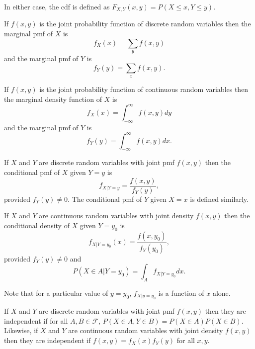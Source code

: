\documentclass{article}
\begin{document}
In either case, the cdf is defined as $F_{X, Y}(x, y) = P(X \le x, Y \le y)$.

\begin{defn}\label{c2d13}
If $f(x, y)$ is the joint probability function of discrete random variables then
the marginal pmf of $X$ is
\[
f_X(x) = \sum_y f(x, y)
\]
and the marginal pmf of $Y$ is
\[
f_Y(y) = \sum_x f(x, y).
\]
\end{defn}

\begin{defn}\label{c2d14}
If $f(x, y)$ is the joint probability function of continuous random variables then
the marginal density function of $X$ is
\[
f_X(x) = \int_{-\infty}^\infty f(x, y) dy
\]
and the marginal pmf of $Y$ is
\[
f_Y(y) = \int_{-\infty}^\infty f(x, y) dx.
\]
\end{defn}

\begin{defn}\label{c2d15}
If $X$ and $Y$ are discrete random variables with joint pmf $f(x, y)$ then the
conditional pmf of $X$ given $Y = y$ is
\[
f_{X|Y=y} = \frac{f(x, y)}{f_Y(y)},
\]
provided $f_Y(y) \ne 0$. The conditional pmf of $Y$ given $X = x$ is defined 
similarly.
\end{defn}

\begin{defn}\label{c2d16}
If $X$ and $Y$ are continuous random variables with joint density $f(x, y)$ then
the conditional density of $X$ given $Y = y_0$ is
\[
f_{X|Y = y_0}(x) = \frac{f(x, y_0)}{f_Y(y_0)},
\]
provided $f_Y(y) \ne 0$ and
\[
P(X \in A|Y = y_0) = \int_A f_{X|Y=y_0}dx.
\]
\end{defn}
Note that for a particular value of $y = y_0$, $f_{X|y=y_0}$ is a function of $x$
alone.

\begin{defn}\label{c2d17}
If $X$ and $Y$ are discrete random variables with joint pmf $f(x, y)$ then they
are independent if for all $A, B \in \mathcal{F}$, $P(X \in A, Y \in B) = 
P(X \in A)P(X \in B)$. Likewise, if $X$ and $Y$ are continuous random variables 
with joint density $f(x, y)$ then they are independent if $f(x, y) = f_X(x)f_Y(y)$ 
for all $x, y$.
\end{defn}
\end{document}
